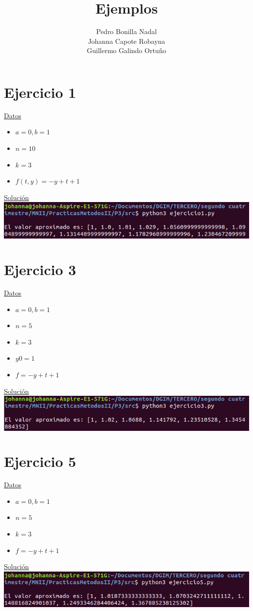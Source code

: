 \documentclass[11pt]{article}
\title{\textbf{Ejemplos}}
\author{Pedro Bonilla Nadal\\
		Johanna Capote Robayna\\
		Guillermo Galindo Ortuño}
\date{}
\begin{document}
\maketitle
\section*{Ejercicio 1} 
\underline{Datos} 
\begin{itemize}

\item $a = 0, b=1$
\item $ n = 10$
\item $k = 3 $
\item $f(t,y) = -y + t +1$ 

\end{itemize}

\underline{Solución} \\
\includegraphics[width=1.1\textwidth]{../img/ej1} \\
\section*{Ejercicio 3}
\underline{Datos}
\begin{itemize}
 
\item $a = 0, b=1$
\item $ n = 5$
\item $k = 3$
\item $ y0 = 1$
\item $f = -y+t+1$
\end{itemize}

\underline{Solución} \\
\includegraphics[width=1.1\textwidth]{../img/ej3}


\section*{Ejercicio 5}
\underline{Datos}
\begin{itemize}

\item $a = 0, b=1$
\item $ n = 5$
\item $ k = 3$
\item $f = -y+t+1$ 
\end{itemize}

\underline{Solución} \\
\includegraphics[width=1.1\textwidth]{../img/ej5} \\
\end{document}
